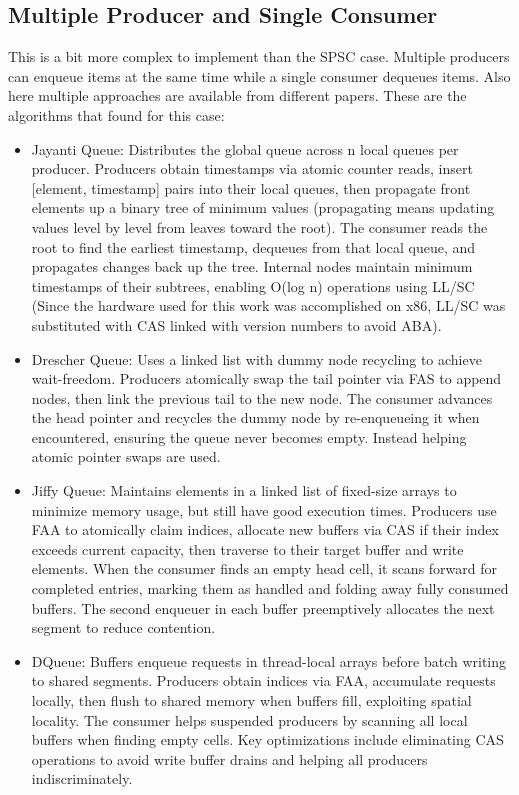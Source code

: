 \subsection{Multiple Producer and Single Consumer}\label{subsec:multiple-producer-and-single-consumer}
This is a bit more complex to implement than the \ac{SPSC} case. Multiple producers can enqueue items at the same time while a single consumer dequeues items. Also here multiple approaches are available from different papers. These are the algorithms that found for this case: 
\begin{itemize}
   \item Jayanti Queue: Distributes the global queue across n local queues per producer. Producers obtain timestamps via atomic counter reads, insert [element, timestamp] pairs into their local queues, then propagate front elements up a binary tree of minimum values (propagating means updating values level by level from leaves toward the root). The consumer reads the root to find the earliest timestamp, dequeues from that local queue, and propagates changes back up the tree. Internal nodes maintain minimum timestamps of their subtrees, enabling O(log n) operations using \ac{LL/SC} (Since the hardware used for this work was accomplished on x86, \ac{LL/SC} was substituted with \ac{CAS} linked with version numbers to avoid ABA). \cite{JayantiLog}
   \item Drescher Queue: Uses a linked list with dummy node recycling to achieve wait-freedom. Producers atomically swap the tail pointer via \ac{FAS} to append nodes, then link the previous tail to the new node. The consumer advances the head pointer and recycles the dummy node by re-enqueueing it when encountered, ensuring the queue never becomes empty. Instead helping atomic pointer swaps are used. \cite{Drescher2015GuardedSections}
   \item Jiffy Queue: Maintains elements in a linked list of fixed-size arrays to minimize memory usage, but still have good execution times. Producers use \ac{FAA} to atomically claim indices, allocate new buffers via \ac{CAS} if their index exceeds current capacity, then traverse to their target buffer and write elements. When the consumer finds an empty head cell, it scans forward for completed entries, marking them as handled and folding away fully consumed buffers. The second enqueuer in each buffer preemptively allocates the next segment to reduce contention. \cite{jiffy}
   \item DQueue: Buffers enqueue requests in thread-local arrays before batch writing to shared segments. Producers obtain indices via \ac{FAA}, accumulate requests locally, then flush to shared memory when buffers fill, exploiting spatial locality. The consumer helps suspended producers by scanning all local buffers when finding empty cells. Key optimizations include eliminating \ac{CAS} operations to avoid write buffer drains and helping all producers indiscriminately. \cite{WangCacheCoherent}
\end{itemize}


